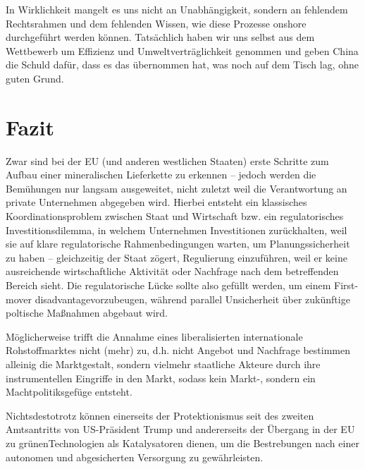 \documentclass[12pt,a4paper,oneside]{book} %
\begin{document}
In Wirklichkeit mangelt es uns nicht an Unabhängigkeit, sondern an fehlendem Rechtsrahmen und dem fehlenden Wissen, wie diese Prozesse onshore durchgeführt werden können. Tatsächlich haben wir uns selbst aus dem Wettbewerb um Effizienz und Umweltverträglichkeit genommen und geben China die Schuld dafür, dass es das übernommen hat, was noch auf dem Tisch lag, ohne guten Grund.

\section{Fazit}
Zwar sind bei der EU (und anderen westlichen Staaten) erste Schritte zum Aufbau einer mineralischen Lieferkette zu erkennen -- jedoch werden die Bemühungen nur langsam ausgeweitet, nicht zuletzt weil die Verantwortung an private Unternehmen abgegeben wird. Hierbei entsteht ein klassisches Koordinationsproblem zwischen Staat und Wirtschaft bzw. ein \glqq regulatorisches Investitionsdilemma\grqq, in welchem Unternehmen Investitionen zurückhalten, weil sie auf klare regulatorische Rahmenbedingungen warten, um Planungssicherheit zu haben -- gleichzeitig der Staat zögert, Regulierung einzuführen, weil er keine ausreichende wirtschaftliche Aktivität oder Nachfrage nach dem betreffenden Bereich sieht. Die regulatorische Lücke sollte also gefüllt werden, um einem \glqq First-mover disadvantage\grqq vorzubeugen, während parallel Unsicherheit über zukünftige poltische Maßnahmen abgebaut wird.

Möglicherweise trifft die Annahme eines liberalisierten internationale Rohstoffmarktes nicht (mehr) zu, d.h. nicht Angebot und Nachfrage bestimmen alleinig die Marktgestalt, sondern vielmehr staatliche Akteure durch ihre instrumentellen Eingriffe in den Markt, sodass kein Markt-, sondern ein Machtpolitiksgefüge entsteht.

Nichtsdestotrotz können einerseits der Protektionismus seit des zweiten Amtsantritts von US-Präsident Trump und andererseits der Übergang in der EU zu \glqq grünen\grqq Technologien als Katalysatoren dienen, um die Bestrebungen nach einer autonomen und abgesicherten Versorgung zu gewährleisten.
\end{document}
